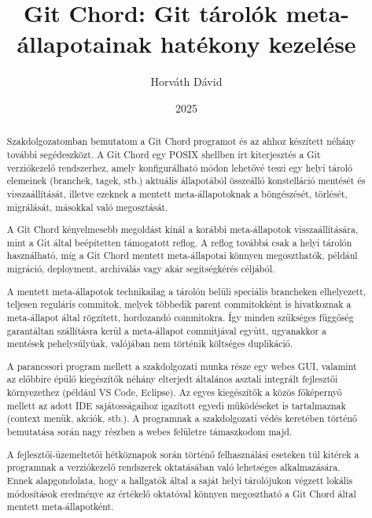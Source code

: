 \documentclass[final]{elteikthesis}[2025/03/25]
\title{Git Chord: Git tárolók meta-állapotainak hatékony kezelése}
\date{2025}
\author{Horváth Dávid}
\affiliation{egyetemi adjunktus}
\begin{document}

\listoftodos
\cleardoublepage

\maketitle

\renewcommand{\abstractname}{Témabejelentő}

\begin{abstract}
Szakdolgozatomban bemutatom a Git Chord programot és az ahhoz készített néhány további segédeszközt.
A Git Chord egy POSIX shellben írt kiterjesztés a Git
verziókezelő rendszerhez, amely konfigurálható módon lehetővé teszi egy helyi tároló elemeinek
(branchek, tagek, stb.)
aktuális állapotából összeálló konstelláció mentését és visszaállítását,
illetve ezeknek a mentett meta-állapotoknak a böngészését, törlését, migrálását, másokkal való megosztását.

A Git Chord kényelmesebb megoldást kínál a korábbi meta-állapotok visszaállítására,
mint a Git által beépítetten támogatott reflog.
A reflog továbbá csak a helyi tárolón használható,
míg a Git Chord mentett meta-állapotai könnyen megoszthatók,
például migráció, deployment, archiválás vagy akár segítségkérés céljából.

A mentett meta-állapotok technikailag a tárolón belüli
speciális brancheken elhelyezett, teljesen reguláris commitok,
melyek többedik parent commitokként is hivatkoznak a meta-állapot által rögzített, hordozandó commitokra.
Így minden szükséges függőség garantáltan szállításra kerül a meta-állapot commitjával együtt,
ugyanakkor a mentések pehelysúlyúak, valójában nem történik költséges duplikáció.

A parancssori program mellett a szakdolgozati munka része egy webes GUI,
valamint az előbbire épülő kiegészítők néhány elterjedt
általános asztali integrált fejlesztői környezethez (például VS Code, Eclipse).
Az egyes kiegészítők a közös főképernyő mellett
az adott IDE sajátosságaihoz igazított egyedi működéseket is tartalmaznak (context menük, akciók, stb.).
A programnak a szakdolgozati védés keretében történő bemutatása során
nagy részben a webes felületre támaszkodom majd.

A fejlesztői-üzemeltetői hétköznapok során történő felhasználási eseteken túl
kitérek a programnak a verziókezelő rendszerek oktatásában való lehetséges alkalmazására.
Ennek alapgondolata, hogy a hallgatók által
a saját helyi tárolójukon végzett lokális módosítások eredménye
az értékelő oktatóval könnyen megosztható a Git Chord által mentett meta-állapotként.
\end{abstract}
\end{document}
